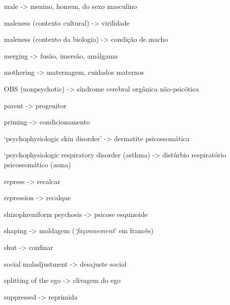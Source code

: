 \smallskip

\noindent male -> menino, homem, do sexo masculino

\smallskip

\noindent maleness (contexto cultural) -> virilidade

\smallskip

\noindent maleness (contexto da biologia) -> condição de macho

\smallskip

\noindent merging -> fusão, imersão, amálgama

\smallskip

\noindent mothering -> maternagem, cuidados maternos

\smallskip

\noindent OBS (nonpsychotic) -> síndrome cerebral orgânica
não-psicótica

\smallskip

\noindent parent -> progenitor

\smallskip

\noindent priming -> condicionamento

\smallskip

\noindent `psychophysiologic skin disorder' -> dermatite psicossomática

\smallskip

\noindent `psychophysiologic respiratory disorder (asthma) -> distúrbio respiratório psicossomático (asma)

\smallskip

\noindent repress -> recalcar

\smallskip

\noindent repression -> recalque

\smallskip

\noindent shizophreniform psychosis -> psicose esquizoide

\smallskip

\noindent shaping -> moldagem (\textit{`façonnement}' em francês)

\smallskip

\noindent shut -> confinar

\smallskip

\noindent social maladjustment -> desajuste social

\smallskip

\noindent splitting of the ego -> clivagem do ego

\smallskip

\noindent suppressed -> reprimida

